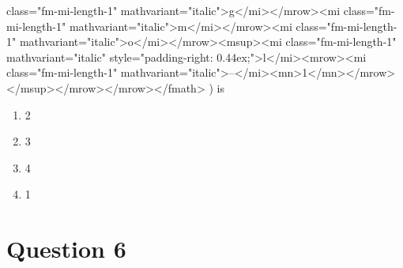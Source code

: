 \documentclass{article}
\begin{document}
class="fm-mi-length-1" mathvariant="italic">g</mi></mrow><mi class="fm-mi-length-1" mathvariant="italic">m</mi></mrow><mi class="fm-mi-length-1" mathvariant="italic">o</mi></mrow><msup><mi class="fm-mi-length-1" mathvariant="italic" style="padding-right: 0.44ex;">l</mi><mrow><mi class="fm-mi-length-1" mathvariant="italic">–</mi><mn>1</mn></mrow></msup></mrow></mrow></fmath> ) is  
\begin{enumerate}[label=(\alph*)]
\item 2
\item 3
\item 4
\item 1
\end{enumerate}
\newpage
\section*{Question 6}
\end{document}

